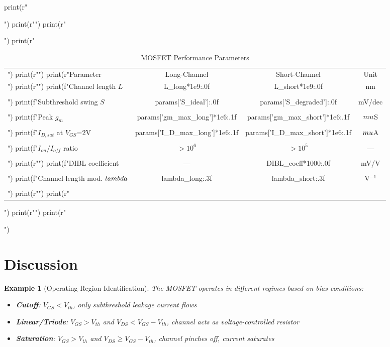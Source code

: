 \documentclass[a4paper, 11pt]{article}
\newtheorem{example}{Example}[section]
\begin{document}
\begin{pycode}
print(r"\begin{table}[htbp]")
print(r"\centering")
print(r"\caption{MOSFET Performance Parameters}")
print(r"\begin{tabular}{lccc}")
print(r"\toprule")
print(r"Parameter & Long-Channel & Short-Channel & Unit \\")
print(r"\midrule")
print(f"Channel length $L$ & {L_long*1e9:.0f} & {L_short*1e9:.0f} & nm \\\\")
print(f"Subthreshold swing $S$ & {params['S_ideal']:.0f} & {params['S_degraded']:.0f} & mV/dec \\\\")
print(f"Peak $g_m$ & {params['gm_max_long']*1e6:.1f} & {params['gm_max_short']*1e6:.1f} & $\\mu$S \\\\")
print(f"$I_{{D,sat}}$ at $V_{{GS}}$=2V & {params['I_D_max_long']*1e6:.1f} & {params['I_D_max_short']*1e6:.1f} & $\\mu$A \\\\")
print(f"$I_{{on}}/I_{{off}}$ ratio & $>10^6$ & $>10^5$ & --- \\\\")
print(r"\midrule")
print(f"DIBL coefficient & --- & {DIBL_coeff*1000:.0f} & mV/V \\\\")
print(f"Channel-length mod. $\\lambda$ & {lambda_long:.3f} & {lambda_short:.3f} & V$^{{-1}}$ \\\\")
print(r"\bottomrule")
print(r"\end{tabular}")
print(r"\label{tab:performance}")
print(r"\end{table}")
\end{pycode}

\section{Discussion}

\begin{example}[Operating Region Identification]
The MOSFET operates in different regimes based on bias conditions:
\begin{itemize}
\item \textbf{Cutoff}: $V_{GS} < V_{th}$, only subthreshold leakage current flows
\item \textbf{Linear/Triode}: $V_{GS} > V_{th}$ and $V_{DS} < V_{GS} - V_{th}$, channel acts as voltage-controlled resistor
\item \textbf{Saturation}: $V_{GS} > V_{th}$ and $V_{DS} \geq V_{GS} - V_{th}$, channel pinches off, current saturates
\end{itemize}
\end{example}
\end{document}
